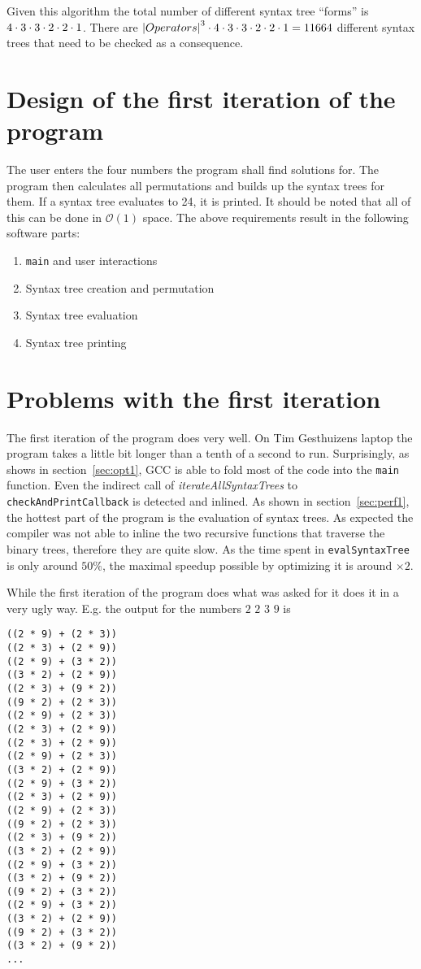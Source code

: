\documentclass[11pt,a4paper]{article}
\newcommand{\code}[1]{\texttt{#1}}
\begin{document}
Given this algorithm the total number of different syntax tree
``forms'' is $4 \cdot 3 \cdot 3 \cdot 2 \cdot 2 \cdot 1$.
There are ${\vert Operators \vert}^3 \cdot 4 \cdot 3 \cdot 3 \cdot 2 \cdot 2 \cdot 1 = 11664$ different syntax trees
that need to be checked as a consequence.

\section{Design of the first iteration of the program}

The user enters the four numbers the program shall find solutions
for. The program then calculates all permutations and builds up the
syntax trees for them. If a syntax tree evaluates to 24, it is
printed.
It should be noted that all of this can be done in $\mathcal{O}(1)$
space.
The above requirements result in the following software parts:
\begin{enumerate}
\item \code{main} and user interactions
\item Syntax tree creation and permutation
\item Syntax tree evaluation
\item Syntax tree printing
\end{enumerate}

\section{Problems with the first iteration}

The first iteration of the program does very well. On Tim Gesthuizens
laptop the program takes a little bit longer than a tenth of a second
to run.
Surprisingly, as shows in section~\ref{sec:opt1}, GCC is able to
fold most of the code into the \code{main} function.
Even the indirect call of \textit{iterateAllSyntaxTrees} to
\code{checkAndPrintCallback} is detected and inlined.
As shown in section~\ref{sec:perf1}, the hottest part of the program
is the evaluation of syntax trees.
As expected the compiler was not able to inline the two recursive
functions that traverse the binary trees, therefore they are quite
slow.
As the time spent in \code{evalSyntaxTree} is only around $50\%$,
the maximal speedup possible by optimizing it is around $\times 2$.

While the first iteration of the program does what was asked for it
does it in a very ugly way. E.g. the output for the numbers $2$ $2$ $3$ $9$
is
\begin{multicols}{2}
\begin{verbatim}
((2 * 9) + (2 * 3))
((2 * 3) + (2 * 9))
((2 * 9) + (3 * 2))
((3 * 2) + (2 * 9))
((2 * 3) + (9 * 2))
((9 * 2) + (2 * 3))
((2 * 9) + (2 * 3))
((2 * 3) + (2 * 9))
((2 * 3) + (2 * 9))
((2 * 9) + (2 * 3))
((3 * 2) + (2 * 9))
((2 * 9) + (3 * 2))
((2 * 3) + (2 * 9))
((2 * 9) + (2 * 3))
((9 * 2) + (2 * 3))
((2 * 3) + (9 * 2))
((3 * 2) + (2 * 9))
((2 * 9) + (3 * 2))
((3 * 2) + (9 * 2))
((9 * 2) + (3 * 2))
((2 * 9) + (3 * 2))
((3 * 2) + (2 * 9))
((9 * 2) + (3 * 2))
((3 * 2) + (9 * 2))
...
\end{verbatim}
\end{multicols}
\end{document}
